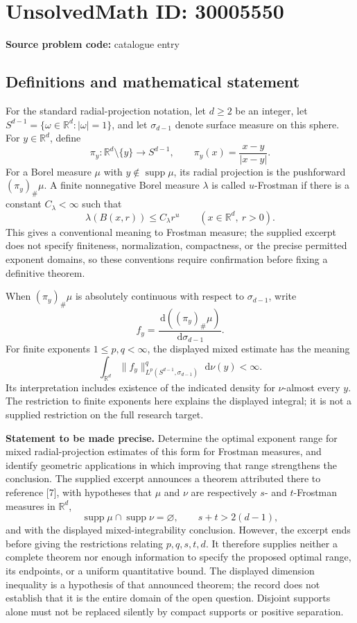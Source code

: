 \documentclass[11pt]{article}
\newcommand{\R}{\mathbb{R}}
\newcommand{\dd}{\,\mathrm{d}}
\begin{document}
\section*{UnsolvedMath ID: 30005550}
\textbf{Source problem code:} catalogue entry
\subsection{Definitions and mathematical statement}
For the standard radial-projection notation, let \(d\geq 2\) be an integer, let \(S^{d-1}=\{\omega\in\R^d:|\omega|=1\}\), and let \(\sigma_{d-1}\) denote surface measure on this sphere. For \(y\in\R^d\), define
\[
\pi_y:\R^d\setminus\{y\}\longrightarrow S^{d-1},\qquad \pi_y(x)=\frac{x-y}{|x-y|}.
\]
For a Borel measure \(\mu\) with \(y\notin\operatorname{supp}\mu\), its radial projection is the pushforward \((\pi_y)_\#\mu\). A finite nonnegative Borel measure \(\lambda\) is called \(u\)-Frostman if there is a constant \(C_\lambda<\infty\) such that
\[
\lambda(B(x,r))\leq C_\lambda r^u\qquad(x\in\R^d,\ r>0).
\]
This gives a conventional meaning to Frostman measure; the supplied excerpt does not specify finiteness, normalization, compactness, or the precise permitted exponent domains, so these conventions require confirmation before fixing a definitive theorem.

When \((\pi_y)_\#\mu\) is absolutely continuous with respect to \(\sigma_{d-1}\), write
\[
f_y=\frac{\dd((\pi_y)_\#\mu)}{\dd\sigma_{d-1}}.
\]
For finite exponents \(1\leq p,q<\infty\), the displayed mixed estimate has the meaning
\[
\int_{\R^d}\|f_y\|_{L^p(S^{d-1},\sigma_{d-1})}^{q}\,\dd\nu(y)<\infty.
\]
Its interpretation includes existence of the indicated density for \(\nu\)-almost every \(y\). The restriction to finite exponents here explains the displayed integral; it is not a supplied restriction on the full research target.

\textbf{Statement to be made precise.} Determine the optimal exponent range for mixed radial-projection estimates of this form for Frostman measures, and identify geometric applications in which improving that range strengthens the conclusion. The supplied excerpt announces a theorem attributed there to reference [7], with hypotheses that \(\mu\) and \(\nu\) are respectively \(s\)- and \(t\)-Frostman measures in \(\R^d\),
\[
\operatorname{supp}\mu\cap\operatorname{supp}\nu=\varnothing,
\qquad s+t>2(d-1),
\]
and with the displayed mixed-integrability conclusion. However, the excerpt ends before giving the restrictions relating \(p,q,s,t,d\). It therefore supplies neither a complete theorem nor enough information to specify the proposed optimal range, its endpoints, or a uniform quantitative bound. The displayed dimension inequality is a hypothesis of that announced theorem; the record does not establish that it is the entire domain of the open question. Disjoint supports alone must not be replaced silently by compact supports or positive separation.
\end{document}
